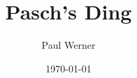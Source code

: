 \documentclass{article}
\title{Pasch's Ding}
\author{Paul Werner}
\date{\today}
\begin{document}
\maketitle
\newcommand{\dir}{./songs}
\newcommand{\inputSongs}[1]{}


\newpage

\tableofcontents

\newpage


	\inputSongs{beatles}
\end{document}
